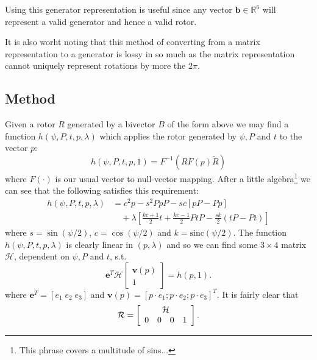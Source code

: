 Using this generator representation is useful since any vector
$\mathbf{b} \in {\mathbb R}^6$ will represent a valid generator and
hence a valid rotor.


It is also worht noting that this method of converting from a matrix representation
to a generator is lossy in so much as the matrix representation cannot uniquely
represent rotations by more the $2\pi$.

\subsection{Method}

Given a rotor $R$ generated by a bivector $B$ of the form above we may find
a function $h(\psi, P, t, p, \lambda)$ which applies the rotor generated
by $\psi, P$ and $t$ to the vector $p$:
\[
h(\psi, P, t, p, 1) = F^{-1} \left( R F(p) \tilde{R} \right)
\]
where $F(\cdot)$ is our usual vector to null-vector mapping.
After a little algebra\footnote{This phrase covers a multitude
  of sins...} we can see that the
following satisfies this requirement:
\begin{align}
h(\psi, P, t, p, \lambda) &=c^2p - s^2PpP - sc\left[pP - Pp\right] \nonumber \\
&\quad+ \lambda\left[ 
 \frac{kc+1}{2} t + \frac{kc-1}{2} PtP
- \frac{sk}{2} (tP - Pt)
\right] \label{eqn:defnh}
\end{align}
where $s = \sin(\psi/2)$, $c = \cos(\psi/2)$ and $k = \textrm{sinc}(\psi/2)$.
The function $h(\psi, P, t, p, \lambda)$ is clearly linear in $(p,\lambda)$ and so
we can find some $3\times4$ matrix $\mathcal{H}$, dependent on
$\psi, P$ and $t$, s.t.
\begin{equation}
\mathbf{e}^T 
 \mathcal{H} \left[
\begin{array}{c}
\mathbf{v}(p) \\ 1
\end{array} 
\right] = h(p, 1). \label{eqn:hi}
\end{equation}
where $\mathbf{e}^T = \left[ e_1 \; e_2 \; e_3 \right]$ and
$\mathbf{v} (p) = \left[ p\cdot e_1 ; p \cdot e_2 ; p \cdot e_3 \right]^T$. It is
fairly clear that
\[
\mathcal{R} = \left[
\begin{array}{cccc}
\multicolumn{4}{c}{\mathcal{H}} \\
                 0 & 0 & 0 & 1 
\end{array}
\right].
\]

